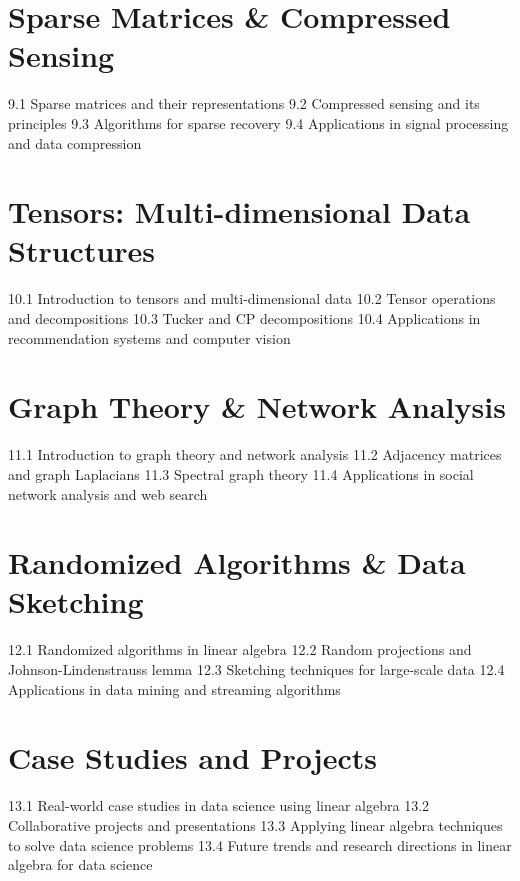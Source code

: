 \section{Sparse Matrices \& Compressed Sensing}
9.1 Sparse matrices and their representations
9.2 Compressed sensing and its principles
9.3 Algorithms for sparse recovery
9.4 Applications in signal processing and data compression
\section{Tensors: Multi-dimensional Data Structures}
10.1 Introduction to tensors and multi-dimensional data
10.2 Tensor operations and decompositions
10.3 Tucker and CP decompositions
10.4 Applications in recommendation systems and computer vision
\section{Graph Theory \& Network Analysis}
11.1 Introduction to graph theory and network analysis
11.2 Adjacency matrices and graph Laplacians
11.3 Spectral graph theory
11.4 Applications in social network analysis and web search
\section{Randomized Algorithms \& Data Sketching}
12.1 Randomized algorithms in linear algebra
12.2 Random projections and Johnson-Lindenstrauss lemma
12.3 Sketching techniques for large-scale data
12.4 Applications in data mining and streaming algorithms
\section{Case Studies and Projects}
13.1 Real-world case studies in data science using linear algebra
13.2 Collaborative projects and presentations
13.3 Applying linear algebra techniques to solve data science problems
13.4 Future trends and research directions in linear algebra for data science
